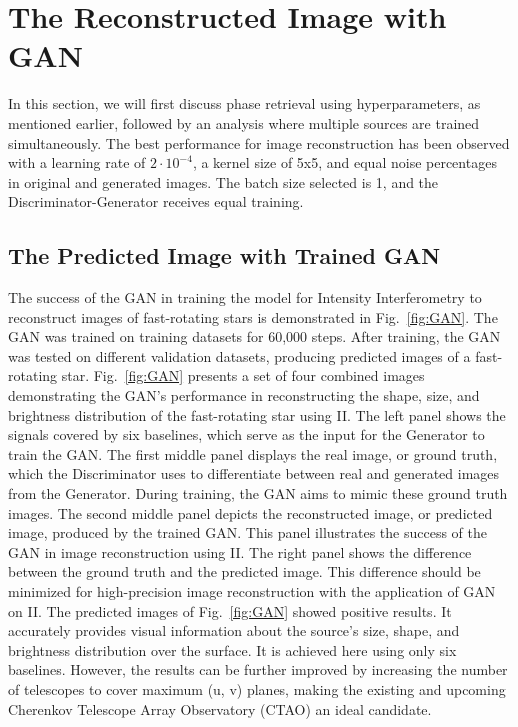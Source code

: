 \section{The Reconstructed Image with GAN}
In this section, we will first discuss phase retrieval using hyperparameters, as mentioned earlier, followed by an analysis where multiple sources are trained simultaneously. The best performance for image reconstruction has been observed with a learning rate of $2 \cdot 10^{-4}$, a kernel size of 5x5, and equal noise percentages in original and generated images. The batch size selected is 1, and the Discriminator-Generator receives equal training.

\subsection{The Predicted Image with Trained GAN}
The success of the GAN in training the model for Intensity Interferometry to reconstruct images of fast-rotating stars is demonstrated in Fig.~\ref{fig:GAN}. The GAN was trained on training datasets for 60,000 steps. After training, the GAN was tested on different validation datasets, producing predicted images of a fast-rotating star. Fig.~\ref{fig:GAN} presents a set of four combined images demonstrating the GAN's performance in reconstructing the shape, size, and brightness distribution of the fast-rotating star using II. The left panel shows the signals covered by six baselines, which serve as the input for the Generator to train the GAN. The first middle panel displays the real image, or ground truth, which the Discriminator uses to differentiate between real and generated images from the Generator. During training, the GAN aims to mimic these ground truth images. The second middle panel depicts the reconstructed image, or predicted image, produced by the trained GAN. This panel illustrates the success of the GAN in image reconstruction using II. The right panel shows the difference between the ground truth and the predicted image. This difference should be minimized for high-precision image reconstruction with the application of GAN on II. The predicted images of Fig.~\ref{fig:GAN} showed positive results. It accurately provides visual information about the source's size, shape, and brightness distribution over the surface. It is achieved here using only six baselines. However, the results can be further improved by increasing the number of telescopes to cover maximum (u, v) planes, making the existing and upcoming Cherenkov Telescope Array Observatory (CTAO) an ideal candidate. 

